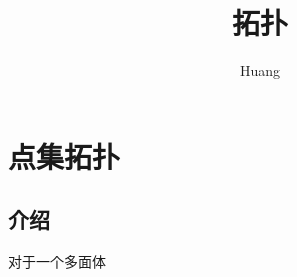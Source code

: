 \documentclass[lang=cn,14pt]{elegantbook}
\title{拓扑}
\author{ Huang}
\begin{document}
	
	\maketitle
	\frontmatter
	
	\tableofcontents
	
	\mainmatter
	\part{点集拓扑}
	\chapter{介绍}
	\begin{theorem}[欧拉定理]
		对于一个多面体
	\end{theorem}
\end{document}

